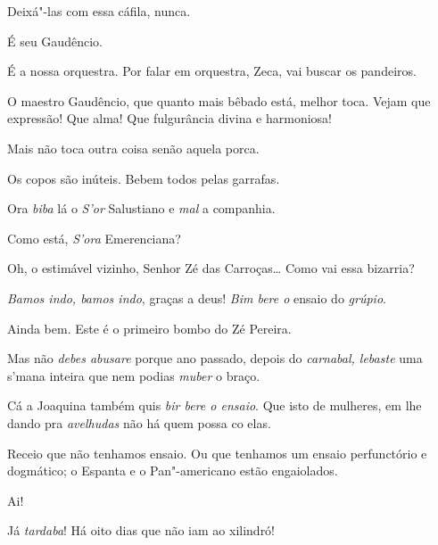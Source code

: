  Deixá"-las com essa cáfila, nunca. 

  É seu Gaudêncio.

 É a nossa orquestra. Por falar em orquestra, Zeca, vai
buscar os pandeiros.  




  O maestro Gaudêncio, que quanto mais
bêbado está, melhor toca. Vejam que expressão! Que alma! Que fulgurância divina
e harmoniosa!

 Mais não toca outra coisa senão aquela
porca. 

   Os copos são
inúteis. Bebem todos pelas garrafas. 

  Ora \textit{biba} lá o \textit{S'or} Salustiano e \textit{mal} a companhia.

 Como está, \textit{S'ora} Emerenciana?

 Oh, o estimável vizinho, Senhor Zé das Carroças\ldots{} Como vai
essa bizarria?

 \textit{Bamos indo, bamos indo}, graças a deus!  \textit{Bim bere o}
ensaio do \textit{grúpio}.

 Ainda bem.   Este é o primeiro bombo
do Zé Pereira.

 Mas não \textit{debes abusare} porque ano passado,
depois do \textit{carnabal, lebaste} uma s'mana inteira que nem
podias \textit{muber} o braço.

 Cá a Joaquina também quis \textit{bir bere o ensaio}. Que isto de
mulheres, em lhe dando pra \textit{avelhudas} não há quem possa co elas.

 Receio que não tenhamos ensaio. Ou que tenhamos um ensaio
perfunctório e dogmático; o Espanta e o Pan"-americano estão engaiolados.

 Ai!

 Já \textit{tardaba}! Há oito dias que não iam ao xilindró!

